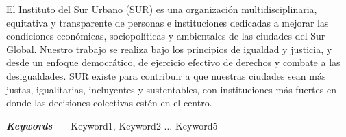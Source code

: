 \label{sec:abstract}
 
El Instituto del Sur Urbano (SUR) es una organización multidisciplinaria, equitativa y transparente de personas e instituciones dedicadas a mejorar las condiciones económicas, sociopolíticas y ambientales de las ciudades del Sur Global. Nuestro trabajo se realiza bajo los principios de igualdad y justicia, y desde un enfoque democrático, de ejercicio efectivo de derechos y combate a las desigualdades. SUR existe para contribuir a que nuestras ciudades sean más justas, igualitarias, incluyentes y sustentables, con instituciones más fuertes en donde las decisiones colectivas estén en el centro. 

{\vspace{5mm}\textbf{\textit{Keywords ---}} Keyword1, Keyword2 $\ldots$ Keyword5} 